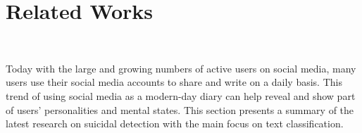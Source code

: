 \documentclass[11pt]{article}
\begin{document}

\section{Related Works}
~\label{Sec:related works} 

Today with the large and growing numbers of active users on social media, many users use their social media accounts to share and write on a daily basis. This trend of using social media as a modern-day diary can help reveal and show part of users’ personalities and mental states. This section presents a summary of the latest research on suicidal detection with the main focus on text classification.
\end{document}
